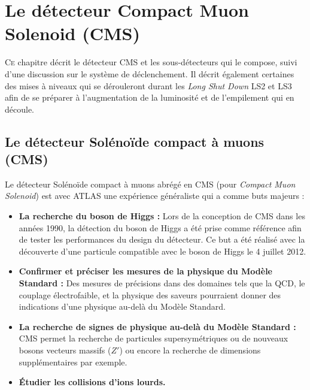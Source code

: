 \chapter{Le détecteur Compact Muon Solenoid (CMS)}
\renewcommand\chapterillustration{CMS/cms.jpeg}
\ThisULCornerWallPaper{1}{\chapterillustration}
\minitoc

\lettrine[lines=4, slope=-0.5em]{C}{e} chapitre décrit le détecteur CMS et les sous-détecteurs qui le compose, suivi d'une discussion sur le système de déclenchement. Il décrit également certaines des mises à niveaux qui se dérouleront durant les \textit{Long Shut Down} LS2 et LS3 afin de se préparer à l'augmentation de la luminosité et de l'empilement qui en découle.

\section{Le détecteur Solénoïde compact à muons (CMS)}
Le détecteur Solénoïde compact à muons abrégé en CMS (pour \textit{Compact Muon Solenoid}) est avec ATLAS une expérience généraliste qui a comme buts majeurs :

\begin{itemize}[label=$\bullet$]
	\item \textbf{La recherche du boson de Higgs : } Lors de la conception de CMS dans les années \num{1990}, la détection du boson de Higgs a été prise comme référence afin de tester les performances du design du détecteur. Ce but a été réalisé avec la découverte d'une particule compatible avec le boson de Higgs le \num{4} juillet \num{2012}.
	\item \textbf{Confirmer et préciser les mesures de la physique du Modèle Standard : } Des mesures de précisions dans des domaines tels que la QCD, le couplage électrofaible, et la physique des saveurs pourraient donner des indications d'une physique au-delà du Modèle Standard.
	\item \textbf{La recherche de signes de physique au-delà du Modèle Standard : }CMS permet la recherche de particules supersymétriques ou de nouveaux bosons vecteurs massifs ($Z'$) ou encore la recherche de dimensions supplémentaires par exemple.
	\item \textbf{Étudier les collisions d'ions lourds.}
\end{itemize}

